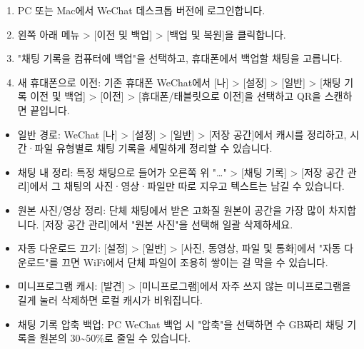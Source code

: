 
\begin{enumerate}
  \item PC 또는 Mac에서 WeChat 데스크톱 버전에 로그인합니다.
  \item 왼쪽 아래 메뉴 > [이전 및 백업] > [백업 및 복원]을 클릭합니다.
  \item "채팅 기록을 컴퓨터에 백업"을 선택하고, 휴대폰에서 백업할 채팅을 고릅니다.
  \item 새 휴대폰으로 이전: 기존 휴대폰 WeChat에서 [나] > [설정] > [일반] > [채팅 기록 이전 및 백업] > [이전] > [휴대폰/태블릿으로 이전]을 선택하고 QR을 스캔하면 끝입니다.
\end{enumerate}


\begin{itemize}
  \item 일반 경로: WeChat [나] > [설정] > [일반] > [저장 공간]에서 캐시를 정리하고, 시간·파일 유형별로 채팅 기록을 세밀하게 정리할 수 있습니다.
  \item 채팅 내 정리: 특정 채팅으로 들어가 오른쪽 위 "…" > [채팅 기록] > [저장 공간 관리]에서 그 채팅의 사진·영상·파일만 따로 지우고 텍스트는 남길 수 있습니다.
  \item 원본 사진/영상 정리: 단체 채팅에서 받은 고화질 원본이 공간을 가장 많이 차지합니다. [저장 공간 관리]에서 "원본 사진"을 선택해 일괄 삭제하세요.
  \item 자동 다운로드 끄기: [설정] > [일반] > [사진, 동영상, 파일 및 통화]에서 "자동 다운로드"를 끄면 WiFi에서 단체 파일이 조용히 쌓이는 걸 막을 수 있습니다.
  \item 미니프로그램 캐시: [발견] > [미니프로그램]에서 자주 쓰지 않는 미니프로그램을 길게 눌러 삭제하면 로컬 캐시가 비워집니다.
  \item 채팅 기록 압축 백업: PC WeChat 백업 시 "압축"을 선택하면 수 GB짜리 채팅 기록을 원본의 30\textasciitilde{}50\%로 줄일 수 있습니다.
\end{itemize}


